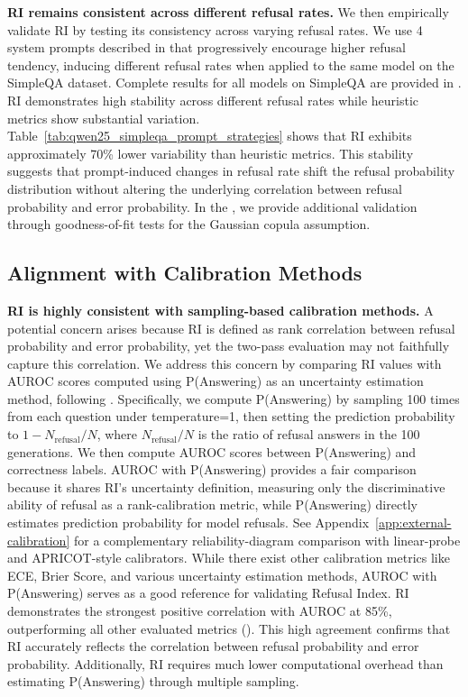 \noindent\textbf{RI remains consistent across different refusal rates.}
We then empirically validate RI by testing its consistency across varying refusal rates. 
We use 4 system prompts described in  that progressively encourage higher refusal tendency, inducing different refusal rates when applied to the same model on the SimpleQA dataset.
Complete results for all models on SimpleQA are provided in . 
RI demonstrates high stability across different refusal rates while heuristic metrics show substantial variation. 
Table~\ref{tab:qwen25_simpleqa_prompt_strategies} shows that RI exhibits approximately 70\% lower variability than heuristic metrics. 
This stability suggests that prompt-induced changes in refusal rate shift the refusal probability distribution without altering the underlying correlation between refusal probability and error probability. 
In the , we provide additional validation through goodness-of-fit tests for the Gaussian copula assumption.

\vspace{-0.5em}
\subsection{Alignment with Calibration Methods}
\vspace{-0.5em}

\noindent\textbf{RI is highly consistent with sampling-based calibration methods.}
A potential concern arises because RI is defined as rank correlation between refusal probability and error probability, yet the two-pass evaluation may not faithfully capture this correlation. 
We address this concern by comparing RI values with AUROC scores computed using P(Answering) as an uncertainty estimation method, following \citet{wei2024measuringshortformfactualitylarge}.
Specifically, we compute P(Answering) by sampling 100 times from each question under temperature=1, then setting the prediction probability to $1 - N_\text{refusal}/N$, where $N_\text{refusal} / N$ is the ratio of refusal answers in the 100 generations. We then compute AUROC scores between P(Answering) and correctness labels.
AUROC with P(Answering) provides a fair comparison because it shares RI's uncertainty definition, measuring only the discriminative ability of refusal as a rank-calibration metric, while P(Answering) directly estimates prediction probability for model refusals. 
See Appendix~\ref{app:external-calibration} for a complementary reliability-diagram comparison with linear-probe and APRICOT-style calibrators.
While there exist other calibration metrics like ECE, Brier Score, and various uncertainty estimation methods, AUROC with P(Answering) serves as a good reference for validating Refusal Index.
RI demonstrates the strongest positive correlation with AUROC at 85\%, outperforming all other evaluated metrics (). 
This high agreement confirms that RI accurately reflects the correlation between refusal probability and error probability. 
Additionally, RI requires much lower computational overhead than estimating P(Answering) through multiple sampling.


